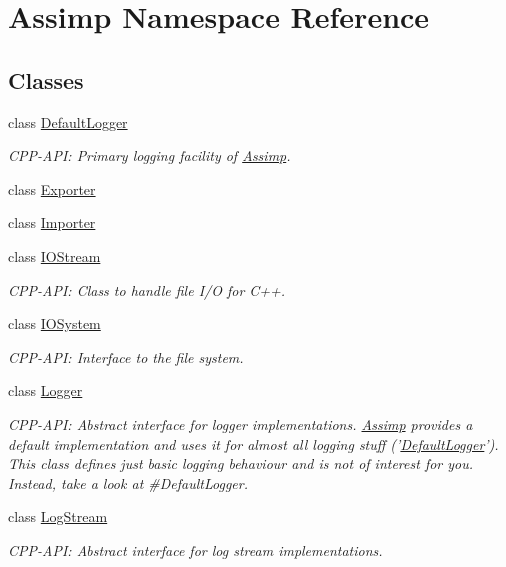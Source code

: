 \hypertarget{namespaceAssimp}{\section{\-Assimp \-Namespace \-Reference}
\label{namespaceAssimp}
}
\subsection*{\-Classes}
\begin{DoxyCompactItemize}
\item 
class \hyperlink{classAssimp_1_1DefaultLogger}{\-Default\-Logger}
\begin{DoxyCompactList}\small\item\em \-C\-P\-P-\/\-A\-P\-I\-: \-Primary logging facility of \hyperlink{namespaceAssimp}{\-Assimp}. \end{DoxyCompactList}\item 
class \hyperlink{classAssimp_1_1Exporter}{\-Exporter}
\item 
class \hyperlink{classAssimp_1_1Importer}{\-Importer}
\item 
class \hyperlink{classAssimp_1_1IOStream}{\-I\-O\-Stream}
\begin{DoxyCompactList}\small\item\em \-C\-P\-P-\/\-A\-P\-I\-: \-Class to handle file \-I/\-O for \-C++. \end{DoxyCompactList}\item 
class \hyperlink{classAssimp_1_1IOSystem}{\-I\-O\-System}
\begin{DoxyCompactList}\small\item\em \-C\-P\-P-\/\-A\-P\-I\-: \-Interface to the file system. \end{DoxyCompactList}\item 
class \hyperlink{classAssimp_1_1Logger}{\-Logger}
\begin{DoxyCompactList}\small\item\em \-C\-P\-P-\/\-A\-P\-I\-: \-Abstract interface for logger implementations. \hyperlink{namespaceAssimp}{\-Assimp} provides a default implementation and uses it for almost all logging stuff ('\hyperlink{classAssimp_1_1DefaultLogger}{\-Default\-Logger}'). \-This class defines just basic logging behaviour and is not of interest for you. \-Instead, take a look at \#\-Default\-Logger. \end{DoxyCompactList}\item 
class \hyperlink{classAssimp_1_1LogStream}{\-Log\-Stream}
\begin{DoxyCompactList}\small\item\em \-C\-P\-P-\/\-A\-P\-I\-: \-Abstract interface for log stream implementations. \end{DoxyCompactList}\item 

\end{DoxyCompactItemize}
